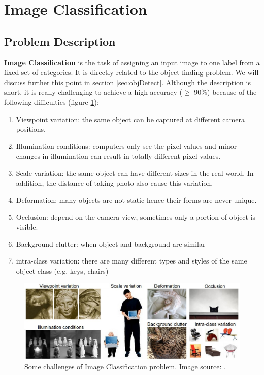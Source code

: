 \section{Image Classification}
\label{sec:imgClass}
\subsection{Problem Description}
\textbf{Image Classification} is the task of assigning an input image to one label from a fixed set of categories. It is directly related to the object finding problem. We will discuss further this point in section \ref{sec:objDetect}. Although the description is short, it is really challenging to achieve a high accuracy ($\geq$ 90\%) because of the following difficulties (figure \ref{fig:ImClasschallenges}):
\begin{enumerate}
	\item Viewpoint variation: the same object can be captured at different camera positions.
	\item Illumination conditions: computers only see the pixel values and minor changes in illumination can result in totally different pixel values. 
	\item Scale variation: the same object can have different sizes in the real world. In addition, the distance of taking photo also cause this variation.
	\item Deformation: many objects are not static hence their forms are never unique.
	\item Occlusion: depend on the camera view, sometimes only a portion of object is visible.
	\item Background clutter: when object and background are similar
	\item intra-class variation: there are many different types and styles of the same object class (e.g. keys, chairs)
\end{enumerate}

\begin{figure}[tb]
\centering
\includegraphics[width =0.9\hsize]{./figures/ImClasschallenges}
\caption{Some challenges of Image Classification problem. Image source: \cite{cs231n}.}
\label{fig:ImClasschallenges}
\end{figure}
